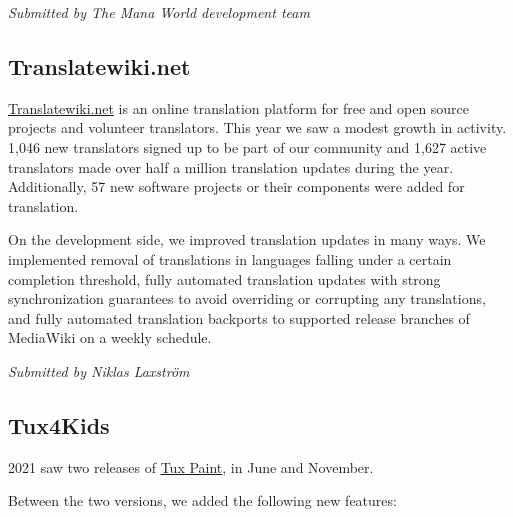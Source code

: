 \documentclass[a4paper]{report}
\begin{document}
{\em Submitted by The Mana World development team}

\subsection{Translatewiki.net}

\href{https://translatewiki.net/}{Translatewiki.net} is an online translation platform for free and open source projects and volunteer translators. This year we saw a modest growth in activity. 1,046 new translators signed up to be part of our community and 1,627 active translators made over half a million translation updates during the year. Additionally, 57 new software projects or their components were added for translation.

On the development side, we improved translation updates in many ways. We implemented removal of translations in languages falling under a certain completion threshold, fully automated translation updates with strong synchronization guarantees to avoid overriding or corrupting any translations, and fully automated translation backports to supported release branches of MediaWiki on a weekly schedule.

{\em Submitted by Niklas Laxström}

\subsection{Tux4Kids}

2021 saw two releases of \href{https://tuxpaint.org/}{Tux Paint}, in June and November.

Between the two versions, we added the following new features:
\end{document}
